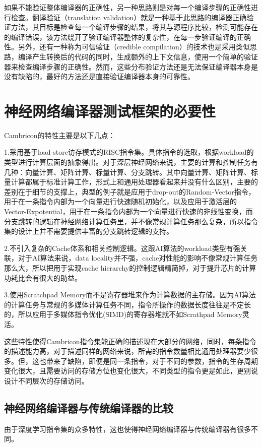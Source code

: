 如果不能验证整体编译器的正确性，另一种思路则是对每一个编译步骤的正确性进行检查。翻译验证（translation validation）就是一种基于此思路的编译器正确验证方法，其目标是检查每一个编译步骤的结果，将其与源程序比较，检测可能存在的编译错误，该方法绕开了验证编译器整体的复杂性，在每一步验证编译的正确性。另外，还有一种称为可信验证（credible compilation）的技术也是采用类似思路，编译产生转换后的代码的同时，生成额外的上下文信息，使用一个简单的验证器来检查编译步骤的正确性。然而，这些分布验证方法还是无法保证编译器本身是没有缺陷的，最好的方法还是直接验证编译器本身的可靠性。

\section{神经网络编译器测试框架的必要性}

Cambricon的特性主要是以下几点：

1.采用基于load-store访存模式的RISC指令集。具体指令的选取，根据workload的类型进行计算层面的抽象得出。对于深层神经网络来说，主要的计算和控制任务有几种：向量计算、矩阵计算、标量计算、分支跳转。其中向量计算、矩阵计算、标量计算都属于标准计算工作，形式上和通用处理器看起来并没有什么区别，主要的差别在于细节的支撑上，典型的例子就是应用于drop-out的Random-Vector指令，用于在一条指令内部为一个向量进行快速随机初始化，以及应用于激活层的Vector-Expotential，用于在一条指令内部为一个向量进行快速的非线性变换，而分支跳转的逻辑在神经网络计算任务里，并不像常规计算任务那么复杂，所以指令集的设计上并不需要提供丰富的分支跳转逻辑的支持。

2.不引入复杂的Cache体系和相关控制逻辑。这跟AI算法的workload类型有强关联，对于AI算法来说，data locality并不强，cache对性能的影响不像常规计算任务那么大，所以把用于实现cache hierarchy的控制逻辑精简掉，对于提升芯片的计算功耗比会有很大的助益。

3.使用Scratchpad Memory而不是寄存器堆来作为计算数据的主存储。因为AI算法的计算任务与常规的多媒体计算任务不同，指令所操作的数据长度往往是不定长的，所以应用于多媒体指令优化(SIMD)的寄存器堆就不如Scrathpad Memory灵活。

这些特性使得Cambricon指令集能正确的描述现在大部分的网络，同时，每条指令的描述能力高，对于描述同样的网络来说，所需的指令数量相比通用处理器要少很多。但，这也带来了缺陷，即便是同一条指令，对于不同的参数，指令的生存周期变化很大，且需要访问的存储方位也变化很大，不同类型的指令更是如此，更别说设计不同层次的存储访问。

\subsection{神经网络编译器与传统编译器的比较}
由于深度学习指令集的众多特性，这也使得神经网络编译器与传统编译器有很多不同。

